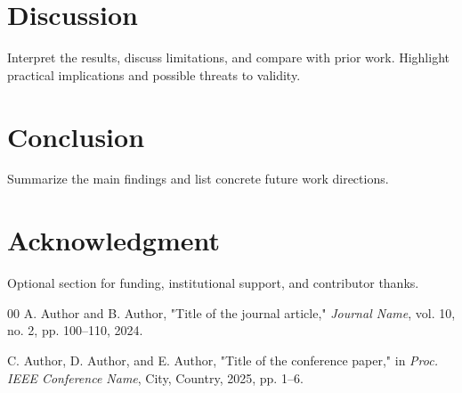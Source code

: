 \documentclass[conference]{IEEEtran}
\begin{document}
\section{Discussion}
Interpret the results, discuss limitations, and compare with prior work.
Highlight practical implications and possible threats to validity.

\section{Conclusion}
Summarize the main findings and list concrete future work directions.

\section*{Acknowledgment}
Optional section for funding, institutional support, and contributor thanks.

\begin{thebibliography}{00}
A. Author and B. Author, "Title of the journal article," \emph{Journal Name},
vol. 10, no. 2, pp. 100--110, 2024.

C. Author, D. Author, and E. Author, "Title of the conference paper," in
\emph{Proc. IEEE Conference Name}, City, Country, 2025, pp. 1--6.
\end{thebibliography}
\end{document}

